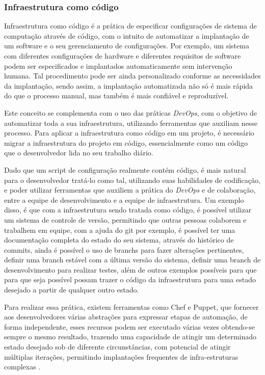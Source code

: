 \subsubsection{Infraestrutura como código}

Infraestrutura como código é a prática de especificar configurações de
sistema de computação através de código, com o intuito de automatizar a implantação
de um software e o seu gerenciamento de configurações. Por exemplo, um sistema
com diferentes configurações de hardware e diferentes
requisitos de software podem ser especificados e implantados automaticamente
sem intervenção humana.\cite{configurationcodesmell} Tal procedimento pode ser
ainda personalizado conforme as necessidades da implantação, sendo assim, a implantação
automatizada não só é mais rápida do que o processo manual, mas também é mais
confiável e reproduzível.

Este conceito se complementa com o uso das práticas \textit{DevOps}, com o objetivo
de automatizar toda a sua infraestrutura, utilizando ferramentas que auxiliam nesse
processo. Para aplicar a infraestrutura como código em um projeto, é necessário
migrar a infraestrutura do projeto em código, essencialmente como um
código que o desenvolvedor lida no seu trabalho diário\cite{byhand}.

Dado que um script de configuração realmente contém código, é mais natural
para o desenvolvedor tratá-lo como tal, utilizando suas habilidades de codificação,
e poder utilizar ferramentas que auxiliem a prática do \textit{DevOps} e de colaboração,
entre a equipe de desenvolvimento e a equipe de infraestrutura\cite{byhand}. Um exemplo disso,
é que com a infraestrutura sendo tratada como código, é possível utilizar um
sistema de controle de versão, permitindo que outras pessoas colaborem e trabalhem em
equipe, com a ajuda do git por exemplo, é possível ter uma documentação completa
do estado do seu sistema, através do histórico de commits, ainda é possível
o uso de branchs para fazer alterações pertinentes, definir uma branch estável
com a última versão do sistema, definir uma branch de desenvolvimento para
realizar testes, além de outros exemplos possíveis para que para que seja possível
possam trazer o código da infraestrutura para uma estado desejado a partir de
qualquer outro estado.


Para realizar essa prática, existem ferramentas como Chef e Puppet, que
fornecer aos desenvolvedores várias abstrações para expressar etapas de automação,
de forma independente, esses recursos podem ser executado várias vezes
obtendo-se sempre o mesmo resultado, trazendo uma capacidade de atingir um determinado
estado desejado sob de diferente circunstâncias, com potencial de atingir
múltiplas iterações, permitindo implantações frequentes de infra-estruturas complexas
\cite{Hummer2013}.


